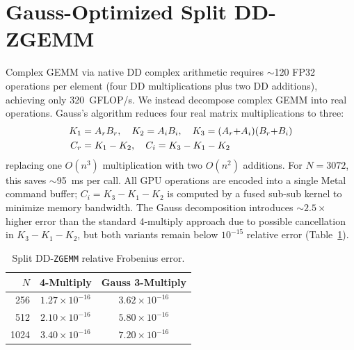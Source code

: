 \documentclass[conference]{IEEEtran}
\newcommand{\ZGEMM}{\texttt{ZGEMM}}
\begin{document}
\section{Gauss-Optimized Split DD-ZGEMM}
\label{sec:zgemm}
Complex GEMM via native DD complex arithmetic requires ${\sim}$120 FP32 operations per element (four DD multiplications plus two DD additions), achieving only 320~GFLOP/s. We instead decompose complex GEMM into real operations.
Gauss's algorithm reduces four real matrix multiplications to three:
\begin{align}
K_1 &= A_r B_r, \quad K_2 = A_i B_i, \quad K_3 = (A_r{+}A_i)(B_r{+}B_i) \notag \\
C_r &= K_1 - K_2, \quad C_i = K_3 - K_1 - K_2 \label{eq:gauss}
\end{align}
replacing one $O(n^3)$ multiplication with two $O(n^2)$ additions. For $N{=}3072$, this saves ${\sim}$95~ms per call. All GPU operations are encoded into a single Metal command buffer; $C_i = K_3 - K_1 - K_2$ is computed by a fused sub-sub kernel to minimize memory bandwidth.
The Gauss decomposition introduces ${\sim}2.5{\times}$ higher error than the standard 4-multiply approach due to possible cancellation in $K_3 - K_1 - K_2$, but both variants remain below $10^{-15}$ relative error (Table~\ref{tab:zgemm-acc}).
\begin{table}[t]
\centering
\caption{Split DD-\ZGEMM{} relative Frobenius error.}
\label{tab:zgemm-acc}
\begin{tabular}{r@{\hskip 8pt}c@{\hskip 8pt}c}
\toprule
\textbf{$N$} & \textbf{4-Multiply} & \textbf{Gauss 3-Multiply} \\
\midrule
256  & $1.27 \times 10^{-16}$ & $3.62 \times 10^{-16}$ \\
512  & $2.10 \times 10^{-16}$ & $5.80 \times 10^{-16}$ \\
1024 & $3.40 \times 10^{-16}$ & $7.20 \times 10^{-16}$ \\
\bottomrule
\end{tabular}
\end{table}
\end{document}
